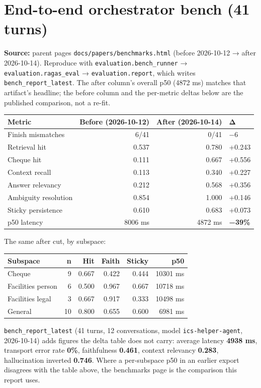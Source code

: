 \section{End-to-end orchestrator bench (41 turns)}\label{end-to-end-orchestrator-bench-41-turns}

\textbf{Source:} parent pages \texttt{docs/papers/benchmarks.html} (before 2026-10-12 → after 2026-10-14). Reproduce with \texttt{evaluation.bench\_runner} → \texttt{evaluation.ragas\_eval} → \texttt{evaluation.report}, which writes \texttt{bench\_report\_latest}. The after column's overall p50 (4872 ms) matches that artifact's headline; the before column and the per-metric deltas below are the published comparison, not a re-fit.

\begin{longtable}[]{@{}lrrl@{}}
\toprule\noalign{}
Metric & Before (2026-10-12) & After (2026-10-14) & Δ \\
\midrule\noalign{}
\endhead
\bottomrule\noalign{}
\endlastfoot
Finish mismatches & 6/41 & 0/41 & −6 \\
Retrieval hit & 0.537 & 0.780 & +0.243 \\
Cheque hit & 0.111 & 0.667 & +0.556 \\
Context recall & 0.113 & 0.340 & +0.227 \\
Answer relevancy & 0.212 & 0.568 & +0.356 \\
Ambiguity resolution & 0.854 & 1.000 & +0.146 \\
Sticky persistence & 0.610 & 0.683 & +0.073 \\
p50 latency & 8006 ms & 4872 ms & \textbf{−39\%} \\
\end{longtable}

The same after cut, by subspace:

\begin{longtable}[]{@{}lrrrrr@{}}
\toprule\noalign{}
Subspace & n & Hit & Faith & Sticky & p50 \\
\midrule\noalign{}
\endhead
\bottomrule\noalign{}
\endlastfoot
Cheque & 9 & 0.667 & 0.422 & 0.444 & 10301 ms \\
Facilities person & 6 & 0.500 & 0.967 & 0.667 & 10718 ms \\
Facilities legal & 3 & 0.667 & 0.917 & 0.333 & 10498 ms \\
General & 10 & 0.800 & 0.655 & 0.600 & 6981 ms \\
\end{longtable}

\texttt{bench\_report\_latest} (41 turns, 12 conversations, model \texttt{ics-helper-agent}, 2026-10-14) adds figures the delta table does not carry: average latency \textbf{4938 ms}, transport error rate \textbf{0\%}, faithfulness \textbf{0.461}, context relevancy \textbf{0.283}, hallucination inverted \textbf{0.746}. Where a per-subspace p50 in an earlier export disagrees with the table above, the benchmarks page is the comparison this report uses.

